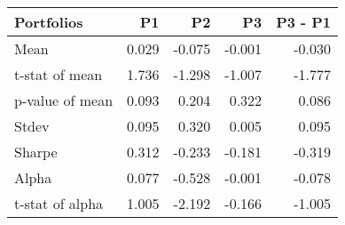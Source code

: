 \begin{tabular}{lrrrr}
\toprule
Portfolios & P1 & P2 & P3 & P3 - P1 \\
\midrule
Mean & 0.029 & -0.075 & -0.001 & -0.030 \\
t-stat of mean & 1.736 & -1.298 & -1.007 & -1.777 \\
p-value of mean & 0.093 & 0.204 & 0.322 & 0.086 \\
Stdev & 0.095 & 0.320 & 0.005 & 0.095 \\
Sharpe & 0.312 & -0.233 & -0.181 & -0.319 \\
Alpha & 0.077 & -0.528 & -0.001 & -0.078 \\
t-stat of alpha & 1.005 & -2.192 & -0.166 & -1.005 \\
\bottomrule
\end{tabular}
